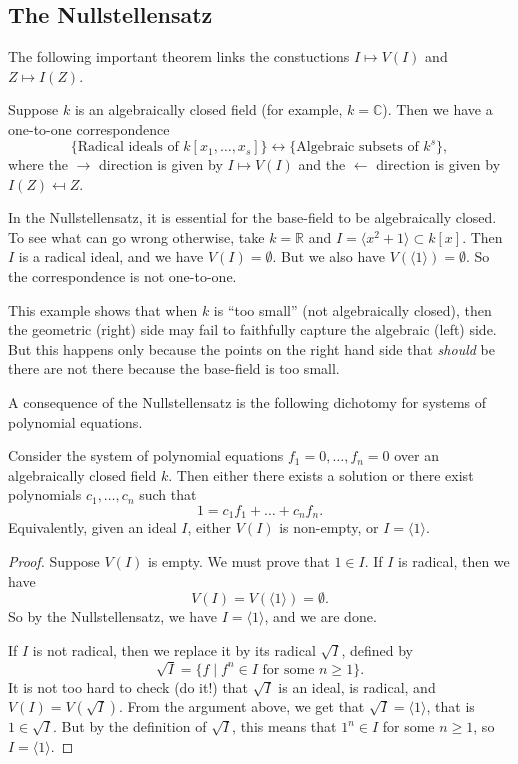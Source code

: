 \documentclass[11pt]{article}
\newcommand{\C}{\mathbb C}
\newcommand{\R}{\mathbb R}
\begin{document}
\subsection{The Nullstellensatz}
The following important theorem links the constuctions $I \mapsto V(I)$ and $Z \mapsto I(Z)$.
\begin{theorem}[Nullstellensatz]
  Suppose $k$ is an algebraically closed field (for example, $k = \C$).
  Then we have a one-to-one correspondence
  \[
    \{\text{Radical ideals of $k[x_1,\dots,x_s]$}\}
    \leftrightarrow
    \{\text{Algebraic subsets of $k^s$}\},
  \]
  where the $\rightarrow$  direction is given by $I \mapsto V(I)$ and the $\leftarrow$ direction is given by $I(Z) \mapsfrom Z$.
\end{theorem}

\begin{example}
  In the Nullstellensatz, it is essential for the base-field to be algebraically closed.
  To see what can go wrong otherwise, take $k = \R$ and $I = \langle  x^2 + 1 \rangle \subset k[x]$.
  Then $I$ is a radical ideal, and we have $V(I) = \emptyset$.
  But we also have $V(\langle  1 \rangle) = \emptyset$.
  So the correspondence is not one-to-one.

  This example shows that when $k$ is ``too small'' (not algebraically closed), then the geometric (right) side may fail to faithfully capture the algebraic (left) side.
  But this happens only because the points on the right hand side that \emph{should} be there are not there because the base-field is too small.
\end{example}

A consequence of the Nullstellensatz is the following dichotomy for systems of polynomial equations.
\begin{theorem}\label{thm:null}
  Consider the system of polynomial equations $f_1 = 0, \dots, f_n = 0$ over an algebraically closed field $k$.
  Then either there exists a solution or there exist polynomials $c_1, \dots, c_n$ such that
  \[ 1 = c_1 f_1 + \dots + c_nf_n.\]
  Equivalently, given an ideal $I$, either $V(I)$ is non-empty, or $I = \langle  1 \rangle$.
\end{theorem}
\begin{proof}
  Suppose $V(I)$ is empty.
  We must prove that $1 \in I$.
  If $I$ is radical, then we have
  \[ V(I) = V(\langle 1 \rangle) = \emptyset.\]
  So by the Nullstellensatz, we have $I = \langle  1 \rangle$, and we are done.

  If $I$ is not radical, then we replace it by its radical $\sqrt I$, defined by
  \[ \sqrt I = \{f \mid f^n \in I \text{ for some $n \geq 1$}\}.\]
  It is not too hard to check (do it!) that $\sqrt I$ is an ideal, is radical, and $V(I) = V(\sqrt I)$.
  From the argument above, we get that $\sqrt I = \langle  1 \rangle$, that is $1 \in \sqrt I$.
  But by the definition of $\sqrt I$, this means that $1^n \in I$ for some $n \geq 1$, so $I = \langle  1 \rangle$.
\end{proof}
\end{document}

